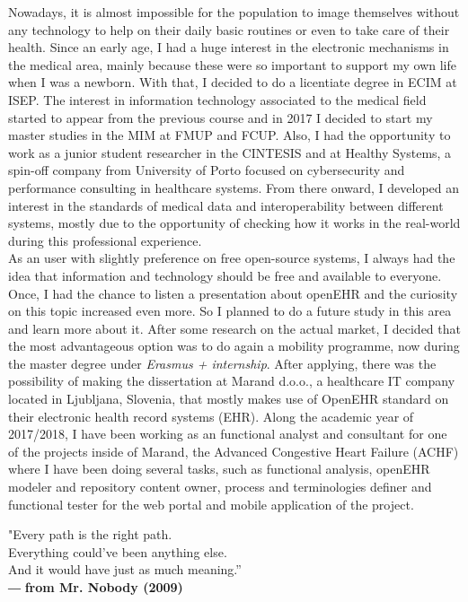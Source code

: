 \documentclass[mim_thesis.tex]{subfiles}
\begin{document}
Nowadays, it is almost impossible for the population to image themselves without any technology to help on their daily basic routines or even to take care of their health. Since an early age, I had a huge interest in the electronic mechanisms in the medical area, mainly because these were so important to support my own life when I was a newborn. With that, I decided to do a licentiate degree in \ac{ECIM} at \ac{ISEP}. The interest in  information technology associated to the medical field started to appear from the previous course and in  2017 I decided to start my master studies in the \ac{MIM} at \ac{FMUP} and \ac{FCUP}. Also, I had the opportunity to work as a junior student researcher in the \ac{CINTESIS} and at Healthy Systems, a spin-off company from University of Porto focused on cybersecurity and performance consulting in healthcare systems. From there onward, I developed an interest in the standards of medical data and interoperability between different systems, mostly due to the opportunity of checking how it works in the real-world during this professional experience.\\ 

As an user with slightly preference on free open-source systems, I always had the idea that information and technology should be free and available to everyone. Once, I had the chance to listen a presentation about openEHR and the curiosity on this topic increased even more. So I planned to do a future study in this area and learn more about it. After some research on the actual market, I decided that the most advantageous option was to do again a mobility programme, now during the master degree under \textit{Erasmus + internship}. After applying, there was the possibility of making the dissertation at Marand d.o.o., a healthcare IT company located in Ljubljana, Slovenia, that mostly makes use of OpenEHR standard on their electronic health record systems (EHR). Along the academic year of 2017/2018, I have been working as an functional analyst and consultant for one of the projects inside of Marand, the Advanced Congestive Heart Failure (ACHF) where I have been doing several tasks, such as functional analysis, openEHR modeler and repository content owner, process and terminologies definer and functional tester for the web portal and mobile application of the project.\par

\begin{flushright}
\vfill {"Every path is the right path. \\ Everything could've been anything else.\\ And it would have just as much meaning.”}
\\― \textbf{from Mr. Nobody (2009)}
\end{flushright}
\end{document}
